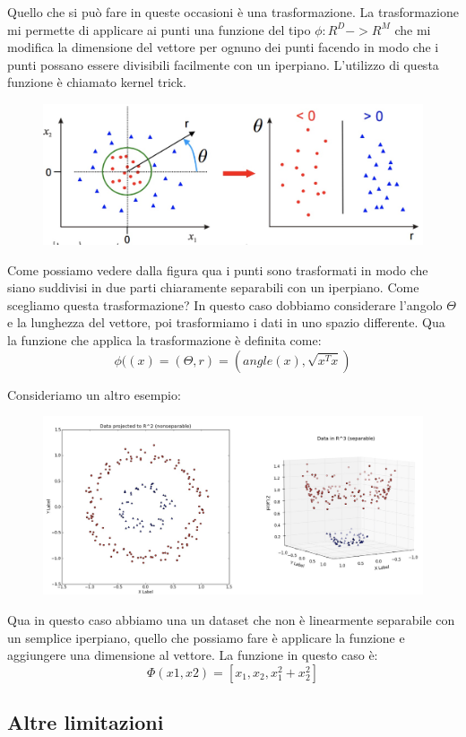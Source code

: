\documentclass[14pt]{extreport}
\begin{document}
Quello che si può fare in queste occasioni è una trasformazione. La trasformazione mi permette di applicare ai punti una funzione del tipo $\phi: R^D
	-> R^M$ che mi modifica la dimensione del vettore per ognuno dei punti facendo in modo che i punti possano essere divisibili facilmente con un
	iperpiano. L'utilizzo di questa funzione è chiamato kernel trick.

\begin{figure}[H]
	\centering
	\includegraphics[width=0.6\linewidth]{154.jpeg}
\end{figure}

Come possiamo vedere dalla figura qua i punti sono trasformati in modo che siano suddivisi in due parti chiaramente separabili con un iperpiano. Come
scegliamo questa trasformazione? In questo caso dobbiamo considerare l'angolo $\Theta$ e la lunghezza del vettore, poi trasformiamo i dati in uno
spazio differente. Qua la funzione che applica la trasformazione è definita come: $$\phi((x) = (\Theta, r) = (angle(x), \sqrt{x^Tx})$$


Consideriamo un altro esempio:
\begin{figure}[H]
	\centering
	\includegraphics[width=0.7\linewidth]{155.jpeg}
\end{figure}
Qua in questo caso abbiamo una un dataset che non è linearmente separabile con un semplice iperpiano, quello che possiamo fare è applicare la funzione
e aggiungere una dimensione al vettore. La funzione in questo caso è: $$\Phi(x1,x2) = [x_1,x_2,x_1^2+x_2^2]$$


\subsection{Altre limitazioni}
\end{document}
